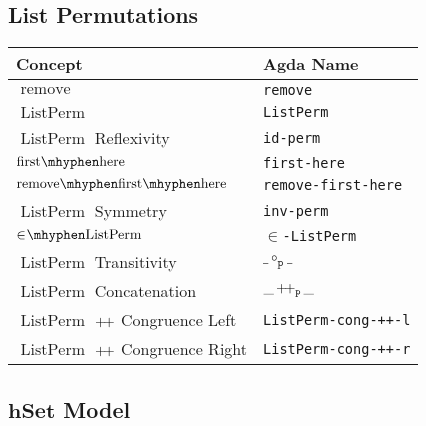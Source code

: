 \documentclass[12pt, parskip, DIV=14]{scrbook}
\DeclareMathOperator\lapp{+\mkern-3mu+}
\renewcommand{\circ}{\vysmwhtcircle}
\newcommand{\hSet}{\mathbf{hSet}}
\newcommand{\firsthere}{\operatorname{first\mhyphen here}}
\newcommand{\remfirsthere}{\operatorname{remove\mhyphen first\mhyphen here}}
\newcommand{\ListPerm}{\operatorname{ListPerm}}
\newcommand{\remove}{\operatorname{remove}}
\begin{document}
\subsection{List Permutations}

\begin{center}
\begin{tabular}{ll}
  Concept & Agda Name \\
  \hline
  $\remove$ & \texttt{remove} \\
  $\ListPerm$ & \texttt{ListPerm} \\
  $\ListPerm$ Reflexivity & \texttt{id-perm} \\
  $\firsthere$ & \texttt{first-here} \\
  $\remfirsthere$ & \texttt{remove-first-here} \\
  $\ListPerm$ Symmetry & \texttt{inv-perm} \\
  $\mathrm{\in\mkern-4mu\mhyphen ListPerm}$ & \texttt{$\in$-ListPerm} \\
  $\ListPerm$ Transitivity & $\_\circ_\texttt{p}\_$ \\
  $\ListPerm$ Concatenation & $\_\lapp_\texttt{p}\_$ \\
  $\ListPerm$ $\lapp$ Congruence Left & \texttt{ListPerm-cong-++-l} \\
  $\ListPerm$ $\lapp$ Congruence Right & \texttt{ListPerm-cong-++-r} \\
\end{tabular}
\end{center}

\subsection{$\hSet$ Model}
\label{subsec:setformal}
\end{document}
